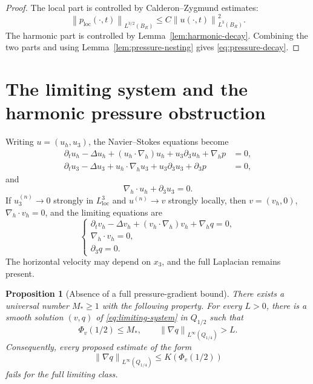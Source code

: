 \documentclass[pdflatex,sn-mathphys-num]{sn-jnl}
\numberwithin{equation}{section}
\theoremstyle{thmstyleone}
\newtheorem{proposition}[theorem]{Proposition}
\theoremstyle{thmstylethree}
\newcommand{\loc}{\mathrm{loc}}
\newcommand{\nabh}{\nabla_h}
\newcommand{\norm}[2]{\left\|#1\right\|_{#2}}
\newcommand{\locp}{\mathrm{loc}}
\begin{document}
\begin{proof}
The local part is controlled by Calderon--Zygmund estimates:
\[
        \norm{p_{\locp}(\cdot,t)}{L^{3/2}(B_R)}
        \le C\norm{u(\cdot,t)}{L^3(B_R)}^2.
\]
The harmonic part is controlled by Lemma~\ref{lem:harmonic-decay}.  Combining the two parts and using Lemma~\ref{lem:pressure-nesting} gives \eqref{eq:pressure-decay}.
\end{proof}

\section{The limiting system and the harmonic pressure obstruction}
\label{sec:limiting}

Writing \(u=(u_h,u_3)\), the Navier--Stokes equations become
\begin{align}
\partial_tu_h-\Delta u_h+(u_h\cdot\nabh)u_h+u_3\partial_3u_h+\nabh p&=0,
\label{eq:horizontal}\\
\partial_tu_3-\Delta u_3+u_h\cdot\nabh u_3+u_3\partial_3u_3+\partial_3p&=0,
\label{eq:vertical}
\end{align}
and
\[
        \nabh\cdot u_h+\partial_3u_3=0.
\]
If \(u_3^{(n)}\to0\) strongly in \(L^3_{\loc}\) and \(u^{(n)}\to v\) strongly locally, then \(v=(v_h,0)\), \(\nabh\cdot v_h=0\), and the limiting equations are
\begin{equation}
\begin{cases}
\partial_t v_h-\Delta v_h+(v_h\cdot\nabh)v_h+\nabh q=0,\\
\nabh\cdot v_h=0,\\
\partial_3q=0.
\end{cases}
\label{eq:limiting-system}
\end{equation}
The horizontal velocity may depend on \(x_3\), and the full Laplacian remains present.

\begin{proposition}[Absence of a full pressure-gradient bound]
\label{prop:pressure-obstruction}
There exists a universal number \(M_*\ge1\) with the following property.  For every \(L>0\), there is a smooth solution \((v,q)\) of \eqref{eq:limiting-system} in \(Q_{1/2}\) such that
\[
        \Phi_v(1/2)\le M_*,
        \qquad
        \norm{\nabla q}{L^\infty(Q_{1/4})}>L.
\]
Consequently, every proposed estimate of the form
\[
        \norm{\nabla q}{L^\infty(Q_{1/4})}
        \le K(\Phi_v(1/2))
\]
fails for the full limiting class.
\end{proposition}
\end{document}
